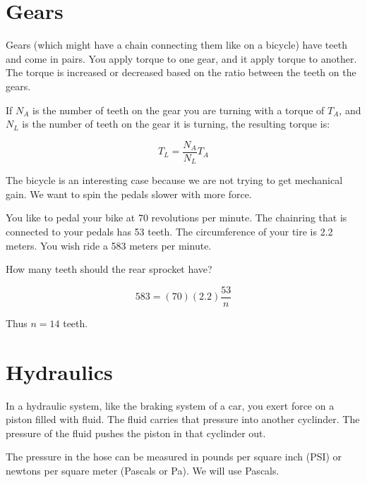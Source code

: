 \section{Gears}

Gears (which might have a chain connecting them like on a bicycle)
have teeth and come in pairs. You apply torque to one gear, and it
apply torque to another. The torque is increased or decreased based
on the ratio between the teeth on the gears.

If $N_A$ is the number of teeth on the gear you are turning with a
torque of $T_A$, and $N_L$ is the number of teeth on the gear it is
turning, the resulting torque is:

$$T_L = \frac{N_A}{N_L} T_A$$


\begin{Exercise}[title={Gears}, label=gear]

The bicycle is an interesting case because we are not trying to get
mechanical gain. We want to spin the pedals slower with more force.
  
You like to pedal your bike at 70 revolutions per minute. The
chainring that is connected to your pedals has 53 teeth. The
circumference of your tire is 2.2 meters. You wish ride a 583 meters
per minute.

How many teeth should the rear sprocket have?
  
\end{Exercise}
\begin{Answer}[ref=ramp]
  
  $$583 = (70)(2.2)\frac{53}{n}$$
  
Thus $n = 14$ teeth.
\end{Answer}

\section{Hydraulics}

In a hydraulic system, like the braking system of a car, you exert
force on a piston filled with fluid. The fluid carries that pressure
into another cyclinder. The pressure of the fluid pushes the piston in
that cyclinder out.

The pressure in the hose can be measured in pounds per square inch
(PSI) or newtons per square meter (Pascals or Pa). We will use Pascals.

